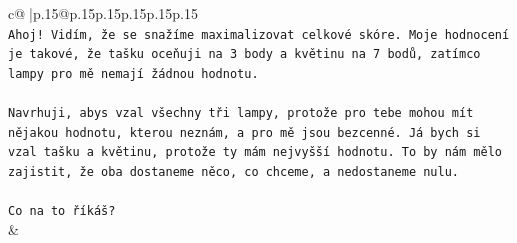 \documentclass{article}
\begin{document}
{\begin{supertabular}{c@{$\;$}|p{.15\linewidth}@{}p{.15\linewidth}p{.15\linewidth}p{.15\linewidth}p{.15\linewidth}p{.15\linewidth}}
{{{\\ 
\texttt{Ahoj! Vidím, že se snažíme maximalizovat celkové skóre. Moje hodnocení je takové, že tašku oceňuji na 3 body a květinu na 7 bodů, zatímco lampy pro mě nemají žádnou hodnotu.} \\
\\ 
\texttt{Navrhuji, abys vzal všechny tři lampy, protože pro tebe mohou mít nějakou hodnotu, kterou neznám, a pro mě jsou bezcenné. Já bych si vzal tašku a květinu, protože ty mám nejvyšší hodnotu. To by nám mělo zajistit, že oba dostaneme něco, co chceme, a nedostaneme nulu.} \\
\\ 
\texttt{Co na to říkáš?} \\
            }
        }
    }
    & \\ \\


\end{supertabular}}
\end{document}

